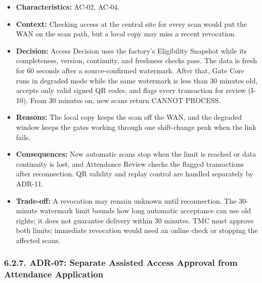\begin{itemize}[leftmargin=36pt, itemsep=2pt, topsep=4pt, parsep=2pt]
  \item \textbf{Characteristics:} AC-02, AC-04.
  \item \textbf{Context:} Checking access at the central site for every scan would put the WAN on the scan path, but a local copy may miss a recent revocation.
  \item \textbf{Decision:} Access Decision uses the factory's Eligibility Snapshot while its completeness, version, continuity, and freshness checks pass. The data is fresh for 60 seconds after a source-confirmed watermark. After that, Gate Core runs in degraded mode while the same watermark is less than 30 minutes old, accepts only valid signed QR codes, and flags every transaction for review (I-10). From 30 minutes on, new scans return CANNOT PROCESS.
  \item \textbf{Reasons:} The local copy keeps the scan off the WAN, and the degraded window keeps the gates working through one shift-change peak when the link fails.
  \item \textbf{Consequences:} New automatic scans stop when the limit is reached or data continuity is lost, and Attendance Review checks the flagged transactions after reconnection. QR validity and replay control are handled separately by ADR-11.
  \item \textbf{Trade-off:} A revocation may remain unknown until reconnection. The 30-minute watermark limit bounds how long automatic acceptance can use old rights; it does not guarantee delivery within 30 minutes. TMC must approve both limits; immediate revocation would need an online check or stopping the affected scans.
\end{itemize}

\subsubsection*{6.2.7. ADR-07: Separate Assisted Access Approval from Attendance Application}

{}

